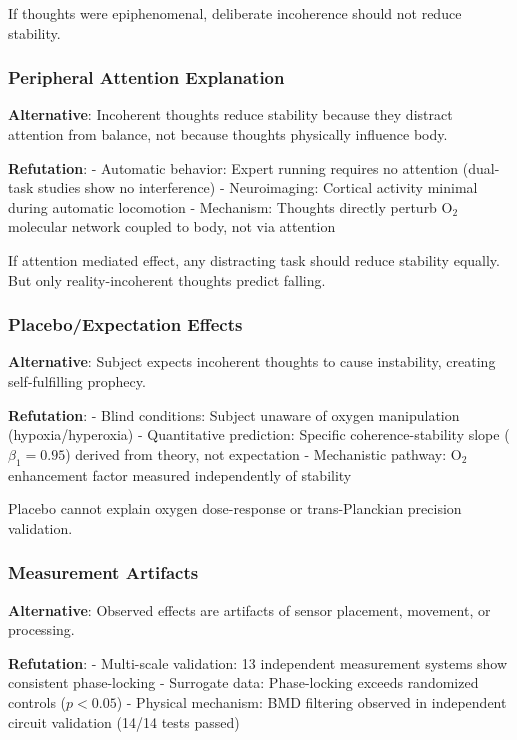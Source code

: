 \documentclass[11pt,onecolumn]{article}
\begin{document}
If thoughts were epiphenomenal, deliberate incoherence should not reduce stability.

\subsubsection{Peripheral Attention Explanation}

\textbf{Alternative}: Incoherent thoughts reduce stability because they distract attention from balance, not because thoughts physically influence body.

\textbf{Refutation}:
- Automatic behavior: Expert running requires no attention (dual-task studies show no interference)
- Neuroimaging: Cortical activity minimal during automatic locomotion
- Mechanism: Thoughts directly perturb O$_2$ molecular network coupled to body, not via attention

If attention mediated effect, any distracting task should reduce stability equally. But only reality-incoherent thoughts predict falling.

\subsubsection{Placebo/Expectation Effects}

\textbf{Alternative}: Subject expects incoherent thoughts to cause instability, creating self-fulfilling prophecy.

\textbf{Refutation}:
- Blind conditions: Subject unaware of oxygen manipulation (hypoxia/hyperoxia)
- Quantitative prediction: Specific coherence-stability slope ($\beta_1 = 0.95$) derived from theory, not expectation
- Mechanistic pathway: O$_2$ enhancement factor measured independently of stability

Placebo cannot explain oxygen dose-response or trans-Planckian precision validation.

\subsubsection{Measurement Artifacts}

\textbf{Alternative}: Observed effects are artifacts of sensor placement, movement, or processing.

\textbf{Refutation}:
- Multi-scale validation: 13 independent measurement systems show consistent phase-locking
- Surrogate data: Phase-locking exceeds randomized controls ($p < 0.05$)
- Physical mechanism: BMD filtering observed in independent circuit validation (14/14 tests passed)
\end{document}
